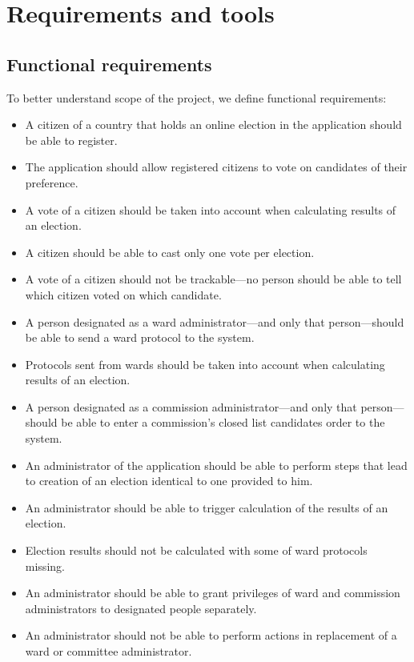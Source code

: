 \documentclass[a4paper,twoside,12pt]{book}
\begin{document}
\chapter{Requirements and tools}
\label{chap:req&tools}
  \section{Functional requirements}
    To better understand scope of the project, we define functional requirements:
    \begin{itemize}
      \item A citizen of a country that holds an online election in the application should be able to register.
      \item The application should allow registered citizens to vote on candidates of their preference.
      \item A vote of a citizen should be taken into account when calculating results of an election.
      \item A citizen should be able to cast only one vote per election.
      \item A vote of a citizen should not be trackable---no person should be able to tell which citizen voted on which candidate.
      \item A person designated as a ward administrator---and only that person---should be able to send a ward protocol to the system.
      \item Protocols sent from wards should be taken into account when calculating results of an election.
      \item A person designated as a commission administrator---and only that person---should be able to enter a commission's closed list candidates order to the system.
      \item An administrator of the application should be able to perform steps that lead to creation of an election identical to one provided to him.
      \item An administrator should be able to trigger calculation of the results of an election.
      \item Election results should not be calculated with some of ward protocols missing.
      \item An administrator should be able to grant privileges of ward and commission administrators to designated people separately.
      \item An administrator should not be able to perform actions in replacement of  a ward or committee administrator.
    \end{itemize}
\end{document}
